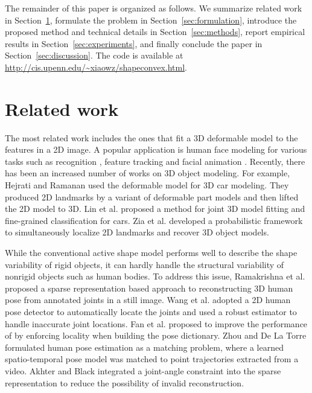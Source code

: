 \documentclass[10pt,journal,cspaper,compsoc]{IEEEtran}
\newcommand{\refSec}[1]{Section~\ref{#1}}
\begin{document}
The remainder of this paper is organized as follows. We summarize related work in \refSec{sec:related}, formulate the problem in \refSec{sec:formulation}, introduce the proposed method and technical details in \refSec{sec:methods}, report empirical results in \refSec{sec:experiments}, and finally conclude the paper in \refSec{sec:discussion}. The code is available at \url{http://cis.upenn.edu/~xiaowz/shapeconvex.html}.

\section{Related work}\label{sec:related}

The most related work includes the ones that fit a 3D deformable model to the features in a 2D image. A popular application is human face modeling for various tasks such as recognition \cite{blanz2003face}, feature tracking \cite{gu20063d} and facial animation \cite{cao20133d}. Recently, there has been an increased number of works on 3D object modeling. For example, Hejrati and Ramanan \cite{hejrati2012analyzing} used the deformable model for 3D car modeling. They produced 2D landmarks by a variant of deformable part models \cite{felzenszwalb2008discriminatively} and then lifted the 2D model to 3D. Lin et al. \cite{lin2014jointly} proposed a method for joint 3D model fitting and fine-grained classification for cars. Zia \cite{zia2013detailed} et al. developed a probabilistic framework to simultaneously localize 2D landmarks and recover 3D object models.

While the conventional active shape model performs well to describe the shape variability of rigid objects, it can hardly handle the structural variability of nonrigid objects such as human bodies. To address this issue, Ramakrishna et al. \cite{ramakrishna2012reconstructing} proposed a sparse representation based approach to reconstructing 3D human pose from annotated joints in a still image. Wang et al. \cite{wang2014robust} adopted a 2D human pose detector to automatically locate the joints and used a robust estimator to handle inaccurate joint locations. Fan et al. \cite{fan2014pose} proposed to improve the performance of \cite{ramakrishna2012reconstructing} by enforcing locality when building the pose dictionary. Zhou and De La Torre \cite{zhou2014sptio} formulated human pose estimation as a matching problem, where a learned spatio-temporal pose model was matched to point trajectories extracted from a video. Akhter and Black \cite{akhter2015pose} integrated a joint-angle constraint into the sparse representation to reduce the possibility of invalid reconstruction.
\end{document}
